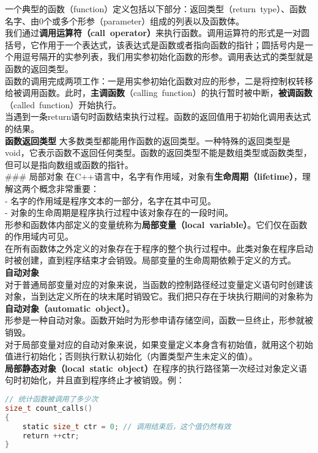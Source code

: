 \documentclass[
  a4paper,
  oneside,tablecaptionabove
]{scrbook}
\begin{document}
一个典型的函数（function）定义包括以下部分：返回类型（return~type）、函数名字、由0个或多个形参（parameter）组成的列表以及函数体。\\
我们通过\textbf{调用运算符（call~operator）}来执行函数。调用运算符的形式是一对圆括号，它作用于一个表达式，该表达式是函数或者指向函数的指针；圆括号内是一个用逗号隔开的实参列表，我们用实参初始化函数的形参。调用表达式的类型就是函数的返回类型。\\
函数的调用完成两项工作：一是用实参初始化函数对应的形参，二是将控制权转移给被调用函数。此时，\textbf{主调函数}（calling~function）的执行暂时被中断，\textbf{被调函数}（called~function）开始执行。\\
当遇到一条return语句时函数结束执行过程。函数的返回值用于初始化调用表达式的结果。\\
\textbf{函数返回类型}
大多数类型都能用作函数的返回类型。一种特殊的返回类型是void，它表示函数不返回任何类型。函数的返回类型不能是数组类型或函数类型，但可以是指向数组或函数的指针。\\
\#\#\# 局部对象
在C++语言中，名字有作用域，对象有\textbf{生命周期（lifetime）}，理解这两个概念非常重要：\\
- 名字的作用域是程序文本的一部分，名字在其中可见。\\
- 对象的生命周期是程序执行过程中该对象存在的一段时间。\\
形参和函数体内部定义的变量统称为\textbf{局部变量（local~variable）}。它们仅在函数的作用域内可见。\\
在所有函数体之外定义的对象存在于程序的整个执行过程中。此类对象在程序启动时被创建，直到程序结束才会销毁。局部变量的生命周期依赖于定义的方式。\\
\textbf{自动对象}\\
对于普通局部变量对应的对象来说，当函数的控制路径经过变量定义语句时创建该对象，当到达定义所在的块末尾时销毁它。我们把只存在于块执行期间的对象称为\textbf{自动对象（automatic~object）}。\\
形参是一种自动对象。函数开始时为形参申请存储空间，函数一旦终止，形参就被销毁。\\
对于局部变量对应的自动对象来说，如果变量定义本身含有初始值，就用这个初始值进行初始化；否则执行默认初始化（内置类型产生未定义的值）。\\
\textbf{局部静态对象（local~static~object）}在程序的执行路径第一次经过对象定义语句时初始化，并且直到程序终止才被销毁。例：

\begin{lstlisting}[language={C++}]
// 统计函数被调用了多少次
size_t count_calls()
{
    static size_t ctr = 0; // 调用结束后，这个值仍然有效
    return ++ctr;
}
\end{lstlisting}
\end{document}
